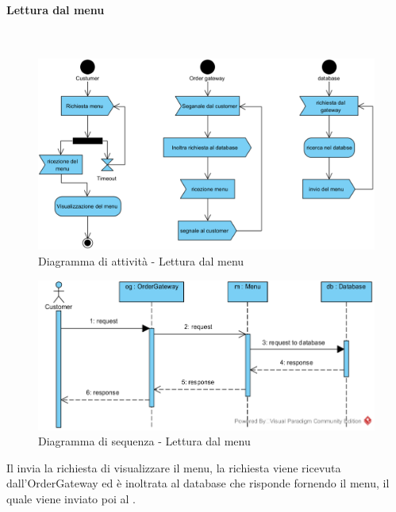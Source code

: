 \begin{samepage}
\paragraph{Lettura dal menu}\mbox{}\\
\begin{figure}[H]
	\centering
	\includegraphics[width=14cm]{diagrammi_img/attivita/costumer_get_menu.png}
	\caption{Diagramma di attività - Lettura dal menu}
\end{figure}
\end{samepage}
\begin{figure}[H]
	\centering
	\includegraphics[width=14cm]{../../documenti/SpecificaTecnica/diagrammi_img/sequenza/client_visualizza_menu.png}
	\caption{Diagramma di sequenza - Lettura dal menu}
\end{figure}
Il \Customer{} invia la richiesta di visualizzare il menu, la richiesta viene ricevuta dall'Order\-Gateway ed è inoltrata al database che risponde fornendo il menu, il quale viene inviato poi al \Customer{}.

